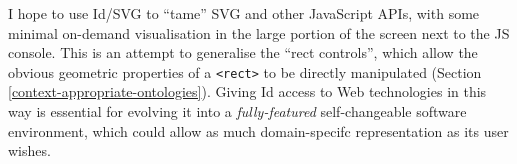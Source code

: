 I hope to use Id{}/SVG to ``tame'' SVG and other JavaScript APIs, with
some minimal on-demand visualisation in the large portion of the screen
next to the JS console. This is an attempt to generalise the ``rect
controls'', which allow the obvious geometric properties of a
\texttt{\textless{}rect\textgreater{}} to be directly manipulated
(Section \ref{context-appropriate-ontologies}). Giving Id{} access to
Web technologies in this way is essential for evolving it into a
\emph{fully-featured} self-changeable software environment, which could
allow as much domain-specifc representation as its user wishes.
